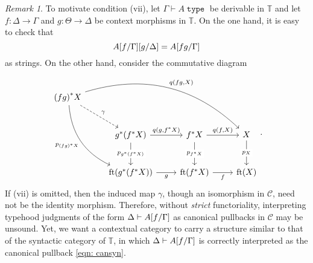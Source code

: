 \documentclass[10pt,letterpaper,cm]{nupset}
\theoremstyle{definition}
\theoremstyle{theorem}
\theoremstyle{remark}
\newtheorem{remark}[definition]{Remark}
\DeclareMathOperator{\ft}{ft}
\newcommand{\0}{\mathbf{0}}
\newcommand{\1}{\mathbf{1}}
\newcommand{\2}{\mathbf{2}}
\DeclareMathOperator{\type}{\mathtt{type}}
\renewcommand{\c}{\mathscr{C}}
\newcommand{\T}{\mathbb T}
\begin{document}
\begin{remark}
To motivate condition (vii), let $\Gamma \vdash A \type$ be derivable in $\T$ and let $f: \Delta \to \Gamma$ and $g: \Theta \to \Delta$ be context morphisms in $\T$. On the one hand, it is easy to check that \[
A\mleft[f/\Gamma\mright]\mleft[g/\Delta\mright] = A\mleft[fg/\Gamma\mright] 
\] as strings. On the other hand, consider the commutative diagram
\[
\begin{tikzcd}[row sep=large]
\mleft(fg\mright)^{\ast}{X} \arrow[rd, "\gamma", dashed] \arrow[rdd, "p_{\mleft(fg\mright)^{\ast}{X}}"', bend right] \arrow[rrrd, "{q(fg, X)}", bend left] &                                                                                                                                 &                                                                            &                                \\
                                                                                                                                                       & g^{\ast}\mleft(f^{\ast}{X}\mright) \arrow[d, "p_{g^{\ast}\mleft(f^{\ast}{X}\mright)}" description] \arrow[r, "{q(g, f^{\ast}{X})}"] & f^{\ast}{X} \arrow[d, "p_{f^{\ast}{X}}" description] \arrow[r, "{q(f,X)}"] & X \arrow[d, "p_X" description] \\
                                                                                                                                                       & \ft(g^{\ast}\mleft(f^{\ast}{X}\mright)) \arrow[r, "g"']                                                                           & \ft(f^{\ast}{X}) \arrow[r, "f"']                                           & \ft(X)                        
\end{tikzcd}
.\] If (vii) is omitted, then the induced map $\gamma$, though an isomorphism in $\c$, need not be the identity morphism.  Therefore, without \emph{strict} functoriality, interpreting typehood judgments of the form $\Delta \vdash A\mleft[f/\Gamma\mright]$ as canonical pullbacks in $\c$ may be unsound. Yet, we want a contextual category to carry a structure similar to that of the syntactic category of $\T$, in which $\Delta \vdash A\mleft[f/\Gamma\mright]$ is correctly interpreted as the canonical pullback \eqref{eqn: cansyn}.    
\end{remark}
\end{document}
